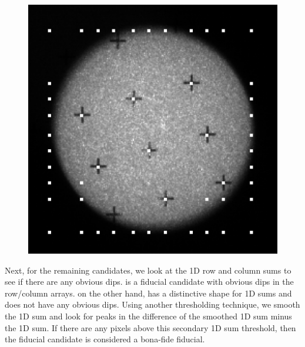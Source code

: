 \documentclass[10pt]{scrartcl}
\begin{document}
\begin{figure}[!ht]
{\begin{subfloatrow}
{        \includegraphics[width=.9\linewidth]{../plots_tables_images/dimenough.eps}
        }
        {
        }
    \end{subfloatrow}
}
{
\caption{}
\label{rulingout}
}
\end{figure}


Next, for the remaining candidates, we look at the 1D row and column sums to see if there are any obvious dips.  is a fiducial candidate with obvious dips in the row/column arrays.  on the other hand, has a distinctive shape for 1D sums and does not have any obvious dips. Using another thresholding technique, we smooth the 1D sum and look for peaks in the difference of the smoothed 1D sum minus the 1D sum. If there are any pixels above this secondary 1D sum threshold, then the fiducial candidate is considered a bona-fide fiducial.  
\end{document}
